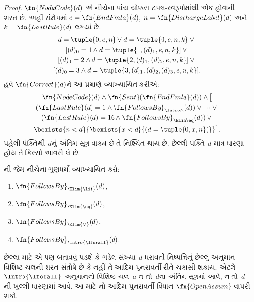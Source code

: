 \begin{proof}
  $\fn{NodeCode}(d)$ એ નીચેના પાંચ ચોક્કસ
  ટપલ-સ્વરૂપોમાંથી એક હોવાની શરત છે. અહીં સંક્ષેપમાં
  $e=\fn{EndFmla}(d)$, $n=\fn{DischargeLabel}(d)$ અને
  $k=\fn{LastRule}(d)$ લખ્યાં છે:
  \begin{multline*}
    d=\tuple{0,e,n} \lor d=\tuple{0,e,n,k} \lor {}\\
    [(d)_0=1 \land d=\tuple{1,(d)_1,e,n,k}] \lor {}\\
    [(d)_0=2 \land d=\tuple{2,(d)_1,(d)_2,e,n,k}] \lor {}\\
    [(d)_0=3 \land d=\tuple{3,(d)_1,(d)_2,(d)_3,e,n,k}].
  \end{multline*}
  હવે $\fn{Correct}(d)$ને આ પ્રમાણે
  વ્યાખ્યાયિત કરીએ:
  \begin{multline*}
    \fn{NodeCode}(d) \land \fn{Sent}(\fn{EndFmla}(d)) \land \bigl[{}\\
    (\fn{LastRule}(d) = 1 \land
    \fn{FollowsBy}_{\Intro\land}(d)) \lor \dots \lor {}\\
    (\fn{LastRule}(d) = 16 \land \fn{FollowsBy}_{\Elim\eq}(d)) \lor {}\\
    \bexists{n<d}{\bexists{x<d}{(d = \tuple{0, x, n})}}\bigr].
  \end{multline*}
  પહેલી પંક્તિથી~$d$નું અંતિમ
  સૂત્ર વાક્ય છે તે નિશ્ચિત
  થાય છે. છેલ્લી પંક્તિ~$d$
  માત્ર ધારણા હોય તે કિસ્સો આવરી લે છે.
\end{proof}

\begin{prob}
  ની
  જેમ નીચેના ગુણધર્મો વ્યાખ્યાયિત કરો:
  \begin{enumerate}
  \item $\fn{FollowsBy}_{\Elim{\lif}}(d)$,
  \item $\fn{FollowsBy}_{\Elim{\eq}}(d)$,
  \item $\fn{FollowsBy}_{\Elim{\lor}}(d)$,
  \item $\fn{FollowsBy}_{\Intro{\lforall}}(d)$.
  \end{enumerate}
  છેલ્લા માટે એ પણ બતાવવું પડશે કે
  ગડેલ-સંખ્યા~$d$ ધરાવતી
  નિષ્પત્તિનું છેલ્લું અનુમાન
  વિશિષ્ટ ચલની શરત સંતોષે છે કે નહીં
  તે આદિમ પુનરાવર્તી રીતે ચકાસી શકાય.
  એટલે $\Intro{\lforall}$ અનુમાનનો
  વિશિષ્ટ ચલ~$a$ ન તો~$d$ના
  અંતિમ સૂત્રમાં આવે, ન તો~$d$ની
  ખુલ્લી ધારણામાં આવે. આ માટે
  નો
  આદિમ પુનરાવર્તી વિધાન
  $\fn{OpenAssum}$ વાપરી શકો.
\end{prob}

